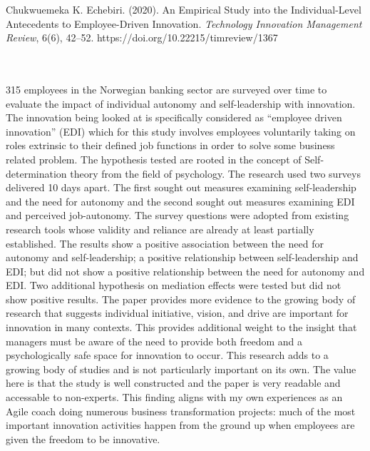 \documentclass{apa7}
\begin{document}
\hfill\begin{minipage}{\dimexpr\textwidth-1in}
\begin{hangparas}{.25in}{1}
Chukwuemeka K. Echebiri. (2020). An Empirical Study into the Individual-Level Antecedents to Employee-Driven Innovation. \textit{Technology Innovation Management Review}, 6(6), 42–52. https://doi.org/10.22215/timreview/1367
\end{hangparas}
\xdef\tpd{\the\prevdepth}
\end{minipage}
\\
\\
315 employees in the Norwegian banking sector are surveyed over time to evaluate the impact of individual autonomy and self-leadership with innovation. The innovation being looked at is specifically considered as ``employee driven innovation'' (EDI) which for this study involves employees voluntarily taking on roles extrinsic to their defined job functions in order to solve some business related problem. The hypothesis tested are rooted in the concept of Self-determination theory from the field of psychology. The research used two surveys delivered 10 days apart. The first sought out measures examining self-leadership and the need for autonomy and the second sought out measures examining EDI and perceived job-autonomy. The survey questions were adopted from existing research tools whose validity and reliance are already at least partially established. The results show a positive association between the need for autonomy and self-leadership; a positive relationship between self-leadership and EDI; but did not show a positive relationship between the need for autonomy and EDI. Two additional hypothesis on mediation effects were tested but did not show positive results. The paper provides more evidence to the growing body of research that suggests individual initiative, vision, and drive are important for innovation in many contexts. This provides additional weight to the insight that managers must be aware of the need to provide both freedom and a psychologically safe space for innovation to occur. This research adds to a growing body of studies and is not particularly important on its own. The value here is that the study is well constructed and the paper is very readable and accessable to non-experts. This finding aligns with my own experiences as an Agile coach doing numerous business transformation projects: much of the most important innovation activities happen from the ground up when employees are given the freedom to be innovative.
\end{document}
